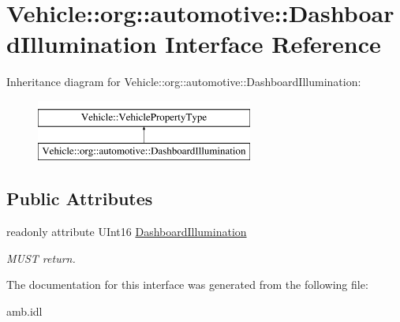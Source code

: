 \hypertarget{interfaceVehicle_1_1org_1_1automotive_1_1DashboardIllumination}{\section{Vehicle\-:\-:org\-:\-:automotive\-:\-:Dashboard\-Illumination Interface Reference}
\label{interfaceVehicle_1_1org_1_1automotive_1_1DashboardIllumination}
}
Inheritance diagram for Vehicle\-:\-:org\-:\-:automotive\-:\-:Dashboard\-Illumination\-:\begin{figure}[H]
\begin{center}
\leavevmode
\includegraphics[height=2.000000cm]{interfaceVehicle_1_1org_1_1automotive_1_1DashboardIllumination}
\end{center}
\end{figure}
\subsection*{Public Attributes}
\begin{DoxyCompactItemize}
\item 
\hypertarget{interfaceVehicle_1_1org_1_1automotive_1_1DashboardIllumination_aaed693a6d73f076e91ed987fc7b59815}{readonly attribute U\-Int16 \hyperlink{interfaceVehicle_1_1org_1_1automotive_1_1DashboardIllumination_aaed693a6d73f076e91ed987fc7b59815}{Dashboard\-Illumination}}\label{interfaceVehicle_1_1org_1_1automotive_1_1DashboardIllumination_aaed693a6d73f076e91ed987fc7b59815}

\begin{DoxyCompactList}\small\item\em M\-U\-S\-T return. \end{DoxyCompactList}\end{DoxyCompactItemize}


The documentation for this interface was generated from the following file\-:\begin{DoxyCompactItemize}
\item 
amb.\-idl\end{DoxyCompactItemize}
